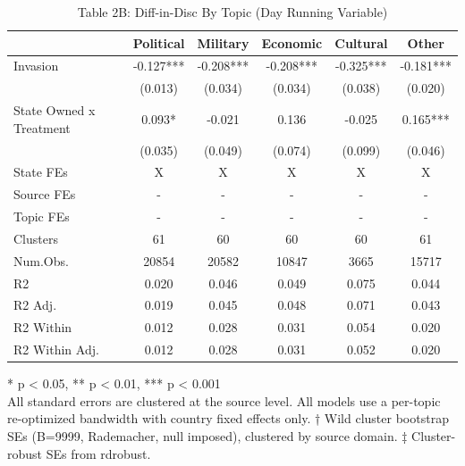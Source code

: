 \begin{table}[t]
\caption{\label{tab:table2b}Table 2B: Diff-in-Disc By Topic (Day Running Variable)} 
\fontsize{12.0pt}{14.0pt}\selectfont
\begin{tabular*}{\linewidth}{@{\extracolsep{\fill}}lccccc}
\toprule
  & Political & Military & Economic & Cultural & Other \\ 
\midrule\addlinespace[2.5pt]
Invasion & -0.127*** & -0.208*** & -0.208*** & -0.325*** & -0.181*** \\ 
 & (0.013) & (0.034) & (0.034) & (0.038) & (0.020) \\ 
State Owned x Treatment & 0.093* & -0.021 & 0.136 & -0.025 & 0.165*** \\ 
{} & {(0.035)} & {(0.049)} & {(0.074)} & {(0.099)} & {(0.046)} \\ 
State FEs & X & X & X & X & X \\ 
Source FEs & - & - & - & - & - \\ 
Topic FEs & - & - & - & - & - \\ 
Clusters & 61 & 60 & 60 & 60 & 61 \\ 
Num.Obs. & 20854 & 20582 & 10847 & 3665 & 15717 \\ 
R2 & 0.020 & 0.046 & 0.049 & 0.075 & 0.044 \\ 
R2 Adj. & 0.019 & 0.045 & 0.048 & 0.071 & 0.043 \\ 
R2 Within & 0.012 & 0.028 & 0.031 & 0.054 & 0.020 \\ 
R2 Within Adj. & 0.012 & 0.028 & 0.031 & 0.052 & 0.020 \\ 
\bottomrule
\end{tabular*}
\begin{minipage}{\linewidth}
\vspace{.05em}
* p < 0.05, ** p < 0.01, *** p < 0.001\\
All standard errors are clustered at the source level. All models use a
per-topic re-optimized bandwidth with country fixed effects only. † Wild cluster
bootstrap SEs (B=9999, Rademacher, null imposed), clustered by source domain. ‡
Cluster-robust SEs from rdrobust.\\
\end{minipage}
\end{table}


